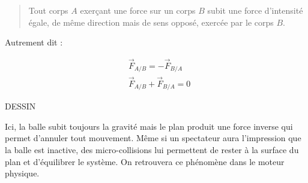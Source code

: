 \begin{quote}
Tout corps $A$ exerçant une force sur un corps $B$ subit une force
d'intensité égale, de même direction mais de sens opposé, exercée par
le corps $B$.
\end{quote}

Autrement dit :

\begin{align*}
  &\vec{F}_{A/B} = -\vec{F}_{B/A} \\ &\vec{F}_{A/B} + \vec{F}_{B/A} =
  0
\end{align*}

DESSIN

Ici, la balle subit toujours la gravité mais le plan produit une force
inverse qui permet d'annuler tout mouvement. Même si un spectateur
aura l'impression que la balle est inactive, des micro-collisions lui
permettent de rester à la surface du plan et d'équilibrer le
système. On retrouvera ce phénomène dans le moteur physique.
